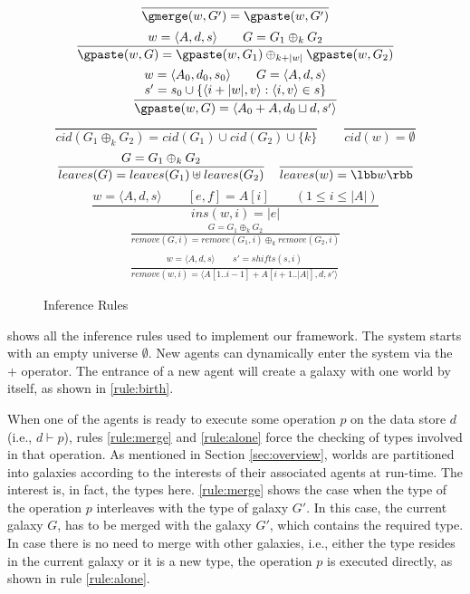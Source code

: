 \begin{figure*}
\begin{minipage}{0.49\textwidth}
\begin{gather*}
    \frac{}{\gmerge(w,G')=\gpaste(w,G')}
  \end{gather*}
  \begin{gather*}
    \frac
      {w=\langle A,d,s\rangle
      \qquad
      G=G_1\oplus_k G_2}
      {\gpaste(w,G)=\gpaste(w,G_1)\oplus_{k+|w|}\gpaste(w,G_2)}
  \\
    \frac
      {\begin{matrix}
        w=\langle A_0,d_0,s_0\rangle \qquad
        G=\langle A,d,s\rangle \\
        s'=s_0\cup\{\langle i+|w|,v\rangle:\langle i,v\rangle\in s\}
      \end{matrix}}
      {\gpaste(w,G)=\langle A_0+A,d_0\sqcup d,s'\rangle}
  \end{gather*}
  \[
    \frac{}{cid(G_1\oplus_k G_2)=cid(G_1)\cup cid(G_2)\cup\{k\}} \qquad
    \frac{}{cid(w)=\emptyset}
  \]
  \[
    \frac{G=G_1\oplus_k G_2}{leaves(G)=leaves(G_1)\uplus leaves(G_2)}
    \quad
    \frac{}{leaves(w)=\lbb w\rbb}
  \]
  \[
    \frac{w=\langle A,d,s\rangle \qquad [e,f]=A[i] \qquad (1\le i\le |A|)}
    {ins(w,i)=|e|}
  \]
  \begin{gather*}
    \frac{G=G_1\oplus_k G_2}
    {remove(G,i)=remove(G_1,i)\oplus_k remove(G_2,i)}
  \\
    \frac{\begin{matrix}
        w=\langle A,d,s\rangle \qquad
        s'=shifts(s,i)
    \end{matrix}}
    {remove(w,i)=\langle A[1..i-1]+A[i+1..|A|],d,s'\rangle}
  \end{gather*}
\end{minipage}
%
  \caption{Inference Rules}
  \label{fig:rules}
\end{figure*}

 shows all the inference rules used to implement our framework.
The system starts with an empty universe $\emptyset$.
New agents can dynamically enter the system via the $+$ operator.
The entrance of a new agent will create a galaxy with one world by itself,
as shown in \ref{rule:birth}.

When one of the agents is ready to execute some operation $p$
on the data store $d$ (i.e., $d\vdash p$),
rules \ref{rule:merge} and \ref{rule:alone} force the checking of
types involved in that operation.
As mentioned in Section \ref{sec:overview},
worlds are partitioned into galaxies according
to the interests of their associated agents at run-time.
The interest is, in fact, the types here.
\ref{rule:merge} shows the case when the type of the operation $p$
interleaves with the type of galaxy $G'$.
In this case, the current galaxy $G$, has to be merged with the galaxy $G'$,
which contains the required type.
In case there is no need to merge with other galaxies,
i.e., either the type resides in the current galaxy or it is a new type,
the operation $p$ is executed directly,
as shown in rule \ref{rule:alone}.

